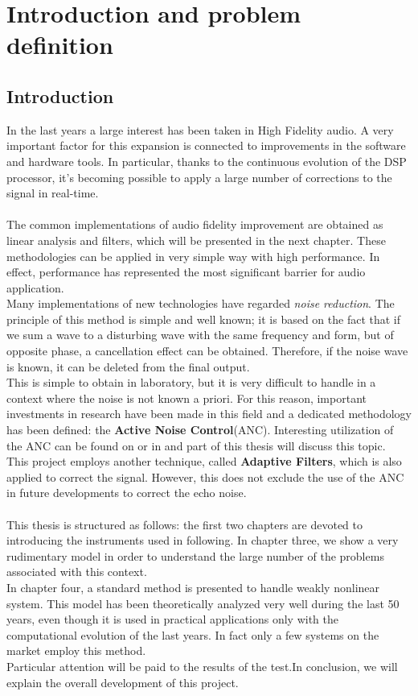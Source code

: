 \part{Introduction and problem definition}
\chapter{Introduction}
In the last years a large interest has been taken in High Fidelity audio. A very important factor for this expansion is connected to improvements in the software and hardware tools. In particular, thanks to the continuous evolution of the DSP processor, it's becoming possible to apply a large number of corrections to the signal in real-time.\\\\
The common implementations of audio fidelity improvement are obtained as linear analysis and filters, which will be presented in the next chapter. These methodologies can be applied in very simple way with high performance. In effect, performance has represented the most significant barrier for audio application.\\
Many implementations of new technologies have regarded \textit{noise reduction}. The principle of this method is simple and well known; it is based on the fact that if we sum a wave to a disturbing wave with the same frequency and form, but of opposite phase, a cancellation effect can be obtained. Therefore, if the noise wave is known, it can be deleted from the final output.\\
This is simple to obtain in laboratory, but it is very difficult to handle in a context where  the noise is not known a priori. For this reason, important investments in research have been made in this field and a dedicated methodology has been defined: the \textbf{Active Noise Control}(ANC). Interesting utilization of the ANC can be found on \cite{reviewANC} or in \cite{ANCneural} and part of this thesis will discuss this topic. \\
This project employs another technique, called \textbf{Adaptive Filters}, which is also applied to correct the signal. However, this does not exclude the use of the ANC in future developments to correct the echo noise.\\\\
This thesis is structured as follows: the first two chapters are devoted to introducing the instruments used in following.
In chapter three, we show a very rudimentary model in order to understand the large number of the problems associated with this context.\\ 
In chapter four, a standard method is presented to handle weakly nonlinear system. This model has been theoretically analyzed very well during the last 50 years, even though it is used in practical applications only with the computational evolution of the last years. In fact only a few systems on the market employ this method.\\
Particular attention will be paid to the results of the test.In conclusion, we will explain the overall development of this project.

